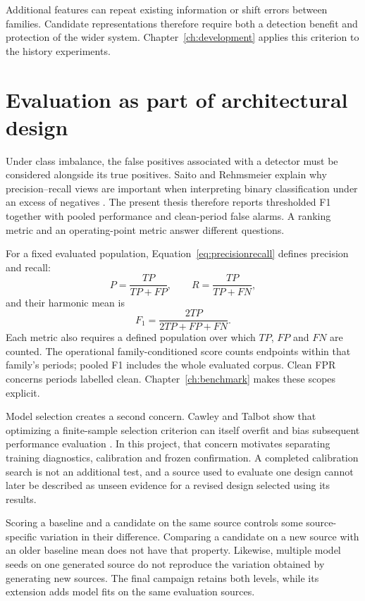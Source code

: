 Additional features can repeat existing information or shift errors between families. Candidate representations therefore require both a detection benefit and protection of the wider system. Chapter~\ref{ch:development} applies this criterion to the history experiments.

\section{Evaluation as part of architectural design}
Under class imbalance, the false positives associated with a detector must be considered alongside its true positives. Saito and Rehmsmeier explain why precision--recall views are important when interpreting binary classification under an excess of negatives \cite{pr}. The present thesis therefore reports thresholded F1 together with pooled performance and clean-period false alarms. A ranking metric and an operating-point metric answer different questions.

For a fixed evaluated population, Equation~\eqref{eq:precisionrecall} defines precision and recall:
\begin{equation}
 P=\frac{TP}{TP+FP},\qquad R=\frac{TP}{TP+FN},\label{eq:precisionrecall}
\end{equation}
and their harmonic mean is
\begin{equation}
 F_1=\frac{2TP}{2TP+FP+FN}.
 \label{eq:f1}
\end{equation}
Each metric also requires a defined population over which $TP$, $FP$ and $FN$ are counted. The operational family-conditioned score counts endpoints within that family's periods; pooled F1 includes the whole evaluated corpus. Clean FPR concerns periods labelled clean. Chapter~\ref{ch:benchmark} makes these scopes explicit.

Model selection creates a second concern. Cawley and Talbot show that optimizing a finite-sample selection criterion can itself overfit and bias subsequent performance evaluation \cite{selection}. In this project, that concern motivates separating training diagnostics, calibration and frozen confirmation. A completed calibration search is not an additional test, and a source used to evaluate one design cannot later be described as unseen evidence for a revised design selected using its results.

Scoring a baseline and a candidate on the same source controls some source-specific variation in their difference. Comparing a candidate on a new source with an older baseline mean does not have that property. Likewise, multiple model seeds on one generated source do not reproduce the variation obtained by generating new sources. The final campaign retains both levels, while its extension adds model fits on the same evaluation sources.

